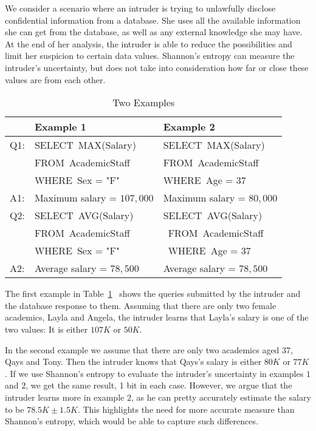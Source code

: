\documentclass{llncs}
\begin{document}
We consider a scenario where an intruder is trying to unlawfully
disclose confidential information from a database. She uses
all the available information she can get from the database, as well as any external knowledge she may have. At the
end of her analysis, the intruder is able to reduce the possibilities
and limit her suspicion to certain data values. Shannon's entropy can measure the
intruder's uncertainty, but does not
take into consideration how far or close these values are from
each other.

\begin{table}[h]
\begin{center}
\footnotesize{
\caption{Two Examples} \label{table:QueryExample}
\begin{tabular}{| l | l |l|}
\hline & \textbf{Example 1} & \textbf{Example 2}\\
\hline Q1: & SELECT~MAX(Salary) & SELECT~MAX(Salary) \\
& FROM~AcademicStaff & FROM~AcademicStaff\\
& WHERE~Sex = "F" & WHERE~Age = $37$\\
\hline A1: & Maximum salary = $107,000$ & Maximum salary = $80,000$ \\
\hline Q2: & SELECT~AVG(Salary) & SELECT~AVG(Salary) \\
& FROM~AcademicStaff & ~FROM~AcademicStaff\\
& WHERE~Sex = "F" & ~WHERE~Age = $37$\\
\hline A2: & Average salary = $78,500$ & Average salary = $78,500$\\
\hline
\end{tabular}}
 \end{center}
\end{table}
The first example in Table~\ref{table:QueryExample}~ shows the
queries submitted by the intruder and the database response to
them. Assuming that there are only two female academics, Layla and
Angela, the intruder learns that Layla's salary is one of the two
values: It is either $107K$ or $50K$.

In the second example we assume that there are only two academics aged $37$,
Qays and Tony. Then the intruder knows that Qays's salary
is either $80K$ or $77K$. If we  use Shannon's entropy to evaluate the intruder's uncertainty  in examples $1$ and $2$, we get
 the same result, 1 bit in each case. However, we argue that the
intruder learns more in example $2$, as he can pretty accurately
estimate the salary to be $78.5K \pm 1.5K$. This highlights the
need for more accurate measure than Shannon's entropy, which would
be able to capture such differences.
\end{document}
